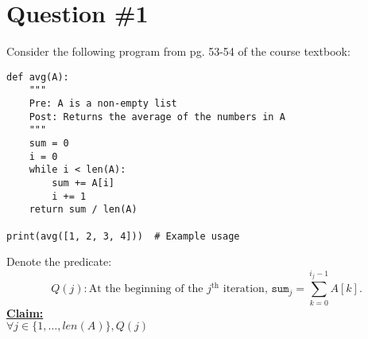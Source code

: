 \documentclass[12pt]{article}
\begin{document}
\renewcommand{\familydefault}{\rmdefault}



\pagebreak
\normalsize

\section*{Question \#1}
Consider the following program from pg. 53-54 of the course textbook:
\begin{lstlisting}
def avg(A):
    """
    Pre: A is a non-empty list
    Post: Returns the average of the numbers in A
    """
    sum = 0
    i = 0
    while i < len(A):
        sum += A[i]
        i += 1
    return sum / len(A)

print(avg([1, 2, 3, 4]))  # Example usage
\end{lstlisting}
Denote the predicate:
\[
Q(j): \text{At the beginning of the } j^{\text{th}} \text{ iteration, } \texttt{sum}_j = \sum_{k=0}^{i_j-1} A[k].
\]
\textbf{\underline{Claim:}} \\
$\forall j \in \{1, \dots, len(A)\}, Q(j)$
\end{document}

